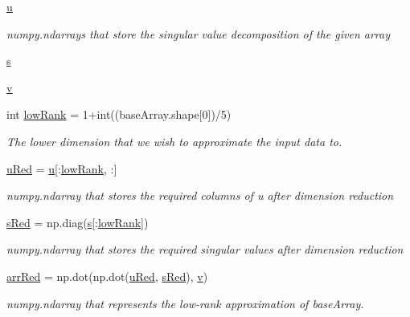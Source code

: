 \begin{DoxyCompactItemize}
\hyperlink{namespacemain_back_acf43846c5a893d78f9a0e7fccf1ba489}{u}
\begin{DoxyCompactList}\small\item\em numpy.\+ndarrays that store the singular value decomposition of the given array \end{DoxyCompactList}\item 
\hyperlink{namespacemain_back_a6b0f2224c369d3ec5bf6a3c7bcf3b60d}{s}
\item 
\hyperlink{namespacemain_back_a92b2e5bb31556f8f2634ccb0d66c3fa3}{v}
\item 
int \hyperlink{namespacemain_back_aee2ac20a3d81f9f6762e47cad7268a32}{low\+Rank} = 1+int((base\+Array.\+shape\mbox{[}0\mbox{]})/5)
\begin{DoxyCompactList}\small\item\em The lower dimension that we wish to approximate the input data to. \end{DoxyCompactList}\item 
\hyperlink{namespacemain_back_a5219f1f00f1e13deec736f49b9019c11}{u\+Red} = \hyperlink{namespacemain_back_acf43846c5a893d78f9a0e7fccf1ba489}{u}\mbox{[}\+:\hyperlink{namespacemain_back_aee2ac20a3d81f9f6762e47cad7268a32}{low\+Rank}, \+:\mbox{]}
\begin{DoxyCompactList}\small\item\em numpy.\+ndarray that stores the required columns of u after dimension reduction \end{DoxyCompactList}\item 
\hyperlink{namespacemain_back_a00584a33a7cf37843fda73a71092ef9d}{s\+Red} = np.\+diag(\hyperlink{namespacemain_back_a6b0f2224c369d3ec5bf6a3c7bcf3b60d}{s}\mbox{[}\+:\hyperlink{namespacemain_back_aee2ac20a3d81f9f6762e47cad7268a32}{low\+Rank}\mbox{]})
\begin{DoxyCompactList}\small\item\em numpy.\+ndarray that stores the required singular values after dimension reduction \end{DoxyCompactList}\item 
\hyperlink{namespacemain_back_ae39c5f6bff104ca56fdeaac54c183913}{arr\+Red} = np.\+dot(np.\+dot(\hyperlink{namespacemain_back_a5219f1f00f1e13deec736f49b9019c11}{u\+Red}, \hyperlink{namespacemain_back_a00584a33a7cf37843fda73a71092ef9d}{s\+Red}), \hyperlink{namespacemain_back_a92b2e5bb31556f8f2634ccb0d66c3fa3}{v})
\begin{DoxyCompactList}\small\item\em numpy.\+ndarray that represents the low-\/rank approximation of base\+Array. \end{DoxyCompactList}\item 

\end{DoxyCompactItemize}
